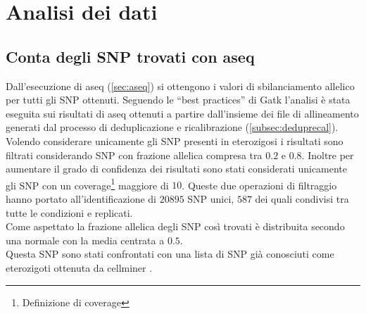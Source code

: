 \graphicspath{{chapters/04/media/}}
\chapter{Analisi dei dati}
\label{cha:analisi}
\section{Conta degli SNP trovati con aseq}
\label{sec:snp_count}
Dall'esecuzione di aseq (\ref{sec:aseq}) si ottengono i valori di sbilanciamento allelico per tutti gli SNP ottenuti.
Seguendo le ``best practices'' di Gatk \cite{gatk} l'analisi \`e stata eseguita sui risultati di aseq ottenuti a partire dall'insieme dei file di allineamento generati dal processo di deduplicazione e ricalibrazione (\ref{subsec:deduprecal}).\\
Volendo considerare unicamente gli SNP presenti in eterozigosi i risultati sono filtrati considerando SNP con frazione allelica compresa tra $0.2$ e $0.8$.
Inoltre per aumentare il grado di confidenza dei risultati sono stati considerati unicamente gli SNP con un coverage\footnote{Definizione di coverage} maggiore di $10$.
Queste due operazioni di filtraggio hanno portato all'identificazione di $20895$ SNP unici, $587$ dei quali condivisi tra tutte le condizioni e replicati.\\
Come aspettato la frazione allelica degli SNP cos\`i trovati \`e distribuita secondo una normale con la media centrata a $0.5$.\\
Questa  SNP sono stati confrontati con una lista di SNP gi\`a conosciuti come eterozigoti ottenuta da cellminer \cite{cellminer}.
